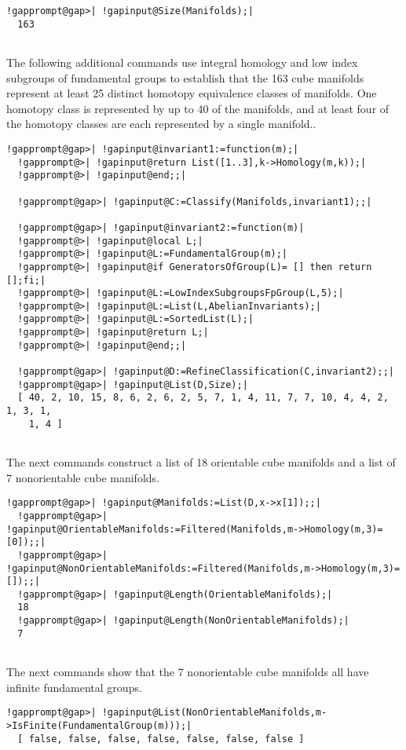 \documentclass[a4paper,11pt]{report}
\begin{document}
{{\begin{Verbatim}[commandchars=!@|,fontsize=\small,frame=single,label=Example]
  !gapprompt@gap>| !gapinput@Size(Manifolds);|
  163
  
\end{Verbatim}
 The following additional commands use integral homology and low index
subgroups of fundamental groups to establish that the 163 cube manifolds
represent at least 25 distinct homotopy equivalence classes of manifolds. One
homotopy class is represented by up to 40 of the manifolds, and at least four
of the homotopy classes are each represented by a single manifold.. 
\begin{Verbatim}[commandchars=!@|,fontsize=\small,frame=single,label=Example]
  !gapprompt@gap>| !gapinput@invariant1:=function(m);|
  !gapprompt@>| !gapinput@return List([1..3],k->Homology(m,k));|
  !gapprompt@>| !gapinput@end;;|
  
  !gapprompt@gap>| !gapinput@C:=Classify(Manifolds,invariant1);;|
  
  !gapprompt@gap>| !gapinput@invariant2:=function(m)|
  !gapprompt@>| !gapinput@local L;|
  !gapprompt@>| !gapinput@L:=FundamentalGroup(m);|
  !gapprompt@>| !gapinput@if GeneratorsOfGroup(L)= [] then return [];fi;|
  !gapprompt@>| !gapinput@L:=LowIndexSubgroupsFpGroup(L,5);|
  !gapprompt@>| !gapinput@L:=List(L,AbelianInvariants);|
  !gapprompt@>| !gapinput@L:=SortedList(L);|
  !gapprompt@>| !gapinput@return L;|
  !gapprompt@>| !gapinput@end;;|
  
  !gapprompt@gap>| !gapinput@D:=RefineClassification(C,invariant2);;|
  !gapprompt@gap>| !gapinput@List(D,Size);|
  [ 40, 2, 10, 15, 8, 6, 2, 6, 2, 5, 7, 1, 4, 11, 7, 7, 10, 4, 4, 2, 1, 3, 1, 
    1, 4 ]
  
\end{Verbatim}
 The next commands construct a list of 18 orientable cube manifolds and a list
of 7 non\texttt{}orientable cube manifolds. 
\begin{Verbatim}[commandchars=!@|,fontsize=\small,frame=single,label=Example]
  !gapprompt@gap>| !gapinput@Manifolds:=List(D,x->x[1]);;|
  !gapprompt@gap>| !gapinput@OrientableManifolds:=Filtered(Manifolds,m->Homology(m,3)=[0]);;|
  !gapprompt@gap>| !gapinput@NonOrientableManifolds:=Filtered(Manifolds,m->Homology(m,3)=[]);;|
  !gapprompt@gap>| !gapinput@Length(OrientableManifolds);|
  18
  !gapprompt@gap>| !gapinput@Length(NonOrientableManifolds);|
  7
  
\end{Verbatim}
 The next commands show that the 7 non\texttt{}orientable cube
manifolds all have infinite fundamental groups. 
\begin{Verbatim}[commandchars=!@|,fontsize=\small,frame=single,label=Example]
  !gapprompt@gap>| !gapinput@List(NonOrientableManifolds,m->IsFinite(FundamentalGroup(m)));|
  [ false, false, false, false, false, false, false ]
  

\end{Verbatim}}}
\end{document}
